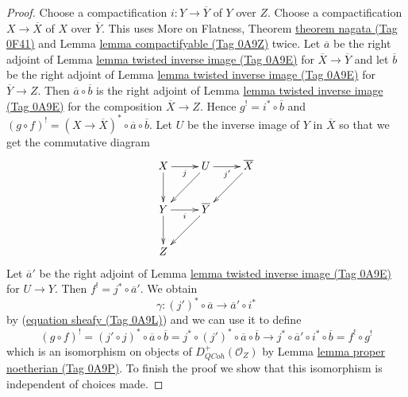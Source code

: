 \documentclass{amsart}
\theoremstyle{plain}
\theoremstyle{definition}
\theoremstyle{remark}
\numberwithin{equation}{subsection}
\def\QCoh{\mathit{QCoh}}
\begin{document}
\begin{proof}
Choose a compactification $i : Y \to \overline{Y}$ of $Y$ over $Z$.
Choose a compactification $X \to \overline{X}$ of $X$ over
$\overline{Y}$. This uses More on Flatness, Theorem \href{https://stacks.math.columbia.edu/tag/0F41}{theorem nagata (Tag 0F41)}
and Lemma \href{https://stacks.math.columbia.edu/tag/0A9Z}{lemma compactifyable (Tag 0A9Z)} twice.
Let $\overline{a}$ be the
right adjoint of Lemma \href{https://stacks.math.columbia.edu/tag/0A9E}{lemma twisted inverse image (Tag 0A9E)} for
$\overline{X} \to \overline{Y}$ and let $\overline{b}$
be the
right adjoint of Lemma \href{https://stacks.math.columbia.edu/tag/0A9E}{lemma twisted inverse image (Tag 0A9E)} for
$\overline{Y} \to Z$.
Then $\overline{a} \circ \overline{b}$ is the
right adjoint of Lemma \href{https://stacks.math.columbia.edu/tag/0A9E}{lemma twisted inverse image (Tag 0A9E)} for
the composition $\overline{X} \to Z$.
Hence $g^! = i^* \circ \overline{b}$ and
$(g \circ f)^! = (X \to \overline{X})^* \circ \overline{a} \circ \overline{b}$.
Let $U$ be the inverse image of $Y$ in $\overline{X}$
so that we get the commutative diagram
$$
\xymatrix{
X \ar[r]_j \ar[d] & U \ar[dl] \ar[r]_{j'} & \overline{X} \ar[dl] \\
Y \ar[r]_i \ar[d] & \overline{Y} \ar[dl] \\
Z
}
$$
Let $\overline{a}'$ be the
right adjoint of Lemma \href{https://stacks.math.columbia.edu/tag/0A9E}{lemma twisted inverse image (Tag 0A9E)} for
$U \to Y$.
Then $f^! = j^* \circ \overline{a}'$. We obtain
$$
\gamma : (j')^* \circ \overline{a} \to \overline{a}' \circ i^*
$$
by (\href{https://stacks.math.columbia.edu/tag/0A9L}{equation sheafy (Tag 0A9L)}) and we can use it to define
$$
(g \circ f)^! =
(j' \circ j)^* \circ \overline{a} \circ \overline{b} =
j^* \circ (j')^* \circ \overline{a} \circ \overline{b}
\to
j^* \circ \overline{a}' \circ i^* \circ \overline{b} =
f^! \circ g^!
$$
which is an isomorphism on objects of $D_\QCoh^+(\mathcal{O}_Z)$ by
Lemma \href{https://stacks.math.columbia.edu/tag/0A9P}{lemma proper noetherian (Tag 0A9P)}. To finish the proof we show that
this isomorphism is independent of choices made.


\end{proof}
\end{document}
